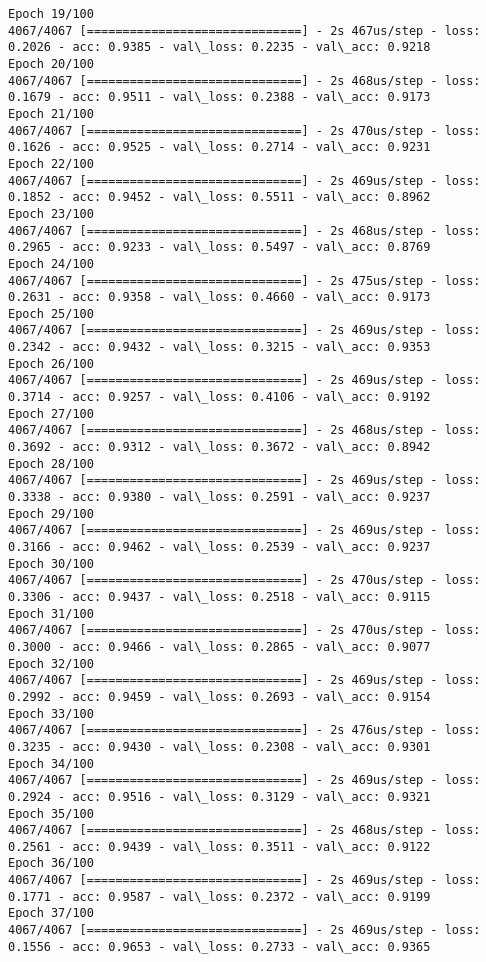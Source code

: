 \documentclass[11pt]{article}
\begin{document}
\begin{Verbatim}[commandchars=\\\{\}]
Epoch 19/100
4067/4067 [==============================] - 2s 467us/step - loss: 0.2026 - acc: 0.9385 - val\_loss: 0.2235 - val\_acc: 0.9218
Epoch 20/100
4067/4067 [==============================] - 2s 468us/step - loss: 0.1679 - acc: 0.9511 - val\_loss: 0.2388 - val\_acc: 0.9173
Epoch 21/100
4067/4067 [==============================] - 2s 470us/step - loss: 0.1626 - acc: 0.9525 - val\_loss: 0.2714 - val\_acc: 0.9231
Epoch 22/100
4067/4067 [==============================] - 2s 469us/step - loss: 0.1852 - acc: 0.9452 - val\_loss: 0.5511 - val\_acc: 0.8962
Epoch 23/100
4067/4067 [==============================] - 2s 468us/step - loss: 0.2965 - acc: 0.9233 - val\_loss: 0.5497 - val\_acc: 0.8769
Epoch 24/100
4067/4067 [==============================] - 2s 475us/step - loss: 0.2631 - acc: 0.9358 - val\_loss: 0.4660 - val\_acc: 0.9173
Epoch 25/100
4067/4067 [==============================] - 2s 469us/step - loss: 0.2342 - acc: 0.9432 - val\_loss: 0.3215 - val\_acc: 0.9353
Epoch 26/100
4067/4067 [==============================] - 2s 469us/step - loss: 0.3714 - acc: 0.9257 - val\_loss: 0.4106 - val\_acc: 0.9192
Epoch 27/100
4067/4067 [==============================] - 2s 468us/step - loss: 0.3692 - acc: 0.9312 - val\_loss: 0.3672 - val\_acc: 0.8942
Epoch 28/100
4067/4067 [==============================] - 2s 469us/step - loss: 0.3338 - acc: 0.9380 - val\_loss: 0.2591 - val\_acc: 0.9237
Epoch 29/100
4067/4067 [==============================] - 2s 469us/step - loss: 0.3166 - acc: 0.9462 - val\_loss: 0.2539 - val\_acc: 0.9237
Epoch 30/100
4067/4067 [==============================] - 2s 470us/step - loss: 0.3306 - acc: 0.9437 - val\_loss: 0.2518 - val\_acc: 0.9115
Epoch 31/100
4067/4067 [==============================] - 2s 470us/step - loss: 0.3000 - acc: 0.9466 - val\_loss: 0.2865 - val\_acc: 0.9077
Epoch 32/100
4067/4067 [==============================] - 2s 469us/step - loss: 0.2992 - acc: 0.9459 - val\_loss: 0.2693 - val\_acc: 0.9154
Epoch 33/100
4067/4067 [==============================] - 2s 476us/step - loss: 0.3235 - acc: 0.9430 - val\_loss: 0.2308 - val\_acc: 0.9301
Epoch 34/100
4067/4067 [==============================] - 2s 469us/step - loss: 0.2924 - acc: 0.9516 - val\_loss: 0.3129 - val\_acc: 0.9321
Epoch 35/100
4067/4067 [==============================] - 2s 468us/step - loss: 0.2561 - acc: 0.9439 - val\_loss: 0.3511 - val\_acc: 0.9122
Epoch 36/100
4067/4067 [==============================] - 2s 469us/step - loss: 0.1771 - acc: 0.9587 - val\_loss: 0.2372 - val\_acc: 0.9199
Epoch 37/100
4067/4067 [==============================] - 2s 469us/step - loss: 0.1556 - acc: 0.9653 - val\_loss: 0.2733 - val\_acc: 0.9365

\end{Verbatim}
\end{document}

